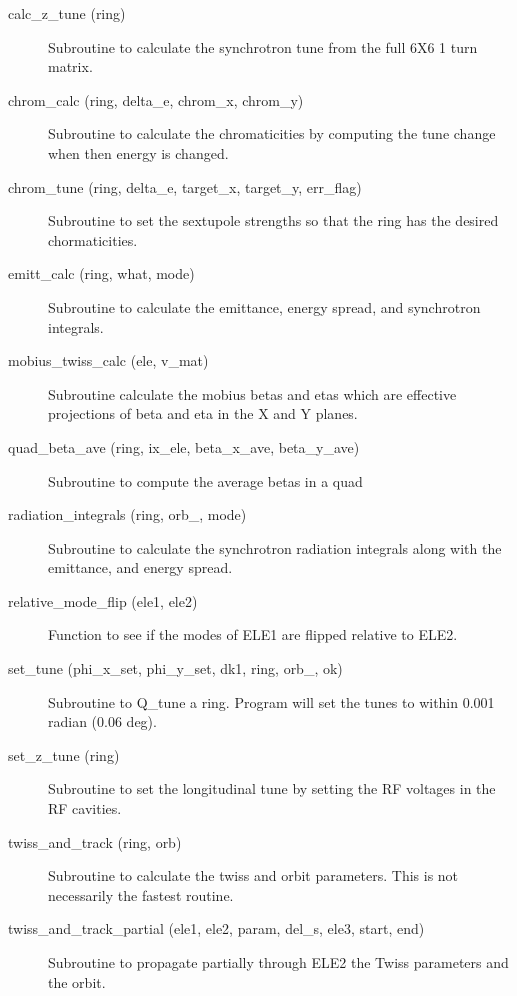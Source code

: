 \begin{description}

\item[calc\_z\_tune (ring)] \Newline
Subroutine to calculate the synchrotron tune from the full 6X6 1 turn matrix. 

\item[chrom\_calc (ring, delta\_e, chrom\_x, chrom\_y)] \Newline
Subroutine to calculate the chromaticities by computing the tune 
change when then energy is changed. 

\item[chrom\_tune (ring, delta\_e, target\_x, target\_y, err\_flag)] \Newline
Subroutine to set the sextupole strengths so that the ring 
has the desired chormaticities. 

\item[emitt\_calc (ring, what, mode)] \Newline
Subroutine to calculate the emittance, energy spread, and synchrotron integrals. 

\item[mobius\_twiss\_calc (ele, v\_mat)] \Newline
Subroutine calculate the mobius betas and etas which are effective 
projections of beta and eta in the X and Y planes. 

\item[quad\_beta\_ave (ring, ix\_ele, beta\_x\_ave, beta\_y\_ave)] \Newline
Subroutine to compute the average betas in a quad 

\item[radiation\_integrals (ring, orb\_, mode)] \Newline
Subroutine to calculate the synchrotron radiation integrals along 
with the emittance, and energy spread. 

\item[relative\_mode\_flip (ele1, ele2)] \Newline
Function to see if the modes of ELE1 are flipped relative to ELE2. 

\item[set\_tune (phi\_x\_set, phi\_y\_set, dk1, ring, orb\_, ok)] \Newline
Subroutine to Q\_tune a ring. Program will set the tunes to within 0.001 radian (0.06 deg). 

\item[set\_z\_tune (ring)] \Newline
Subroutine to set the longitudinal tune by setting the RF voltages in the RF cavities. 

\item[twiss\_and\_track (ring, orb)] \Newline
Subroutine to calculate the twiss and orbit parameters. 
This is not necessarily the fastest routine. 

\item[twiss\_and\_track\_partial (ele1, ele2, param, del\_s, ele3, start, end)] \Newline
Subroutine to propagate partially through ELE2 the Twiss parameters and the orbit. 


\end{description}
